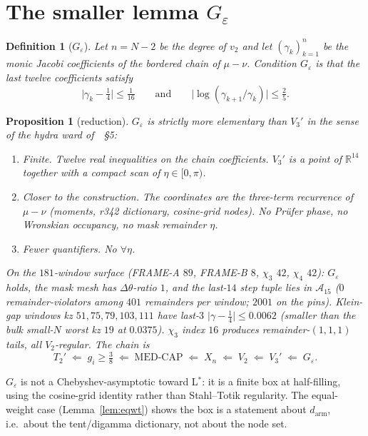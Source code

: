 \documentclass[11pt]{article}
\newtheorem{prop}{Proposition}
\newtheorem{definition}{Definition}
\theoremstyle{remark}
\newcommand{\R}{\mathbb{R}}
\begin{document}
\section{The smaller lemma \texorpdfstring{$G_{\varepsilon}$}{Geps}}\label{sec:gbox}

\begin{definition}[$G_\varepsilon$]\label{def:geps}
Let $n=N-2$ be the degree of $v_2$ and let
$(\gamma_k)_{k=1}^{n}$ be the monic Jacobi coefficients of the
bordered chain of $\mu-\nu$.  Condition $G_\varepsilon$ is that
the last twelve coefficients satisfy
\[
\bigl\lvert\gamma_k-\tfrac14\bigr\rvert\le\tfrac1{16}
\qquad\text{and}\qquad
\bigl\lvert\log(\gamma_{k+1}/\gamma_k)\bigr\rvert\le\tfrac25.
\]
\end{definition}

\begin{prop}[reduction]\label{prop:gbox}
$G_\varepsilon$ is strictly more elementary than $V_3'$ in the
sense of the hydra ward of~\cite{v2}~\S5:
\begin{enumerate}
\item \emph{Finite.}  Twelve real inequalities on the chain
  coefficients.  $V_3'$ is a point of $\R^{14}$ together with a
  compact scan of $\eta\in[0,\pi)$.
\item \emph{Closer to the construction.}  The coordinates are
  the three-term recurrence of $\mu-\nu$ (moments, r342
  dictionary, cosine-grid nodes).  No Pr\"ufer phase, no
  Wronskian occupancy, no mask remainder $\eta$.
\item \emph{Fewer quantifiers.}  No $\forall\eta$.
\end{enumerate}
On the $181$-window surface (FRAME-A $89$, FRAME-B $8$,
$\chi_3$ $42$, $\chi_4$ $42$): $G_\varepsilon$ holds, the mask
mesh has $\Delta\theta$-ratio $1$, and the last-$14$ step tuple
lies in $\mathcal{A}_{15}$ ($0$ remainder-violators among $401$
remainders per window; $2001$ on the pins).  Klein-gap windows
kz $51,75,79,103,111$ have last-$3$
$\lvert\gamma-\tfrac14\rvert\le 0.0062$ (smaller than the bulk
small-$N$ worst kz $19$ at $0.0375$).  $\chi_3$ index $16$
produces remainder-$(1,1,1)$ tails, all $V_2$-regular.
The chain is
\[
T_2'
 \;\Longleftarrow\;
 g_i\ge\tfrac38
 \;\Longleftarrow\;
 \mathrm{MED\text{-}CAP}
 \;\Longleftarrow\;
 X_n
 \;\Longleftarrow\;
 V_2
 \;\Longleftarrow\;
 V_3'
 \;\Longleftarrow\;
 G_\varepsilon.
\]
\end{prop}

$G_\varepsilon$ is not a Chebyshev-asymptotic toward L$^*$: it
is a finite box at half-filling, using the cosine-grid identity
rather than Stahl--Totik regularity.  The equal-weight case
(Lemma~\ref{lem:eqwt}) shows the box is a statement about
$d_{\mathrm{arm}}$, i.e.\ about the tent/digamma dictionary,
not about the node set.
\end{document}
